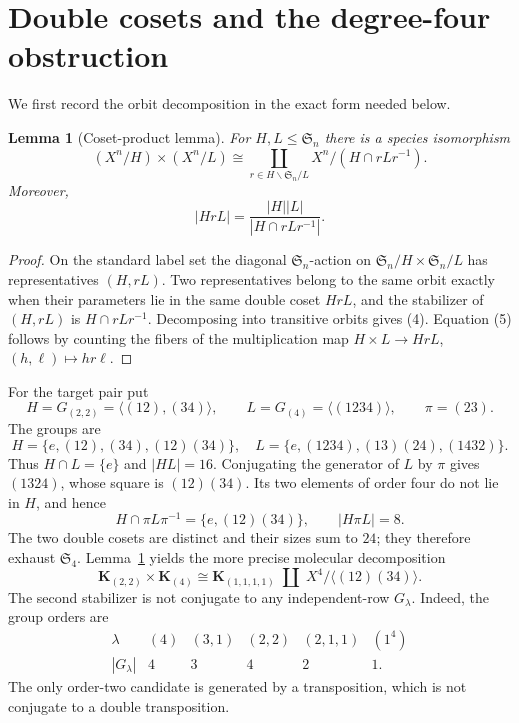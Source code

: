 \documentclass[11pt]{article}
\newtheorem{lemma}[theorem]{Lemma}
\begin{document}
\section{Double cosets and the degree-four obstruction}

We first record the orbit decomposition in the exact form needed below.

\begin{lemma}[Coset-product lemma]\label{lem:coset}
For $H,L\leq\mathfrak{S}_n$ there is a species isomorphism
\begin{equation}
 (X^n/H)\times(X^n/L)
 \cong
 \coprod_{r\in H\backslash\mathfrak{S}_n/L}
 X^n/(H\cap rLr^{-1}).
 \label{eq:coset-decomposition}
\end{equation}
Moreover,
\begin{equation}
 |HrL|=\frac{|H||L|}{|H\cap rLr^{-1}|}.
 \label{eq:double-coset-size}
\end{equation}
\end{lemma}

\begin{proof}
On the standard label set the diagonal $\mathfrak{S}_n$-action on
$\mathfrak{S}_n/H\times\mathfrak{S}_n/L$ has representatives $(H,rL)$.  Two representatives
belong to the same orbit exactly when their parameters lie in the same
double coset $HrL$, and the stabilizer of $(H,rL)$ is
$H\cap rLr^{-1}$.  Decomposing into transitive orbits gives (4).
Equation (5) follows by counting the fibers of the multiplication map
$H\times L\to HrL$, $(h,\ell)\mapsto hr\ell$.
\end{proof}

For the target pair put
\[
 H=G_{(2,2)}=\langle(12),(34)\rangle,
 \qquad L=G_{(4)}=\langle(1234)\rangle,
 \qquad \pi=(23).
\]
The groups are
\[
 H=\{e,(12),(34),(12)(34)\},
 \quad
 L=\{e,(1234),(13)(24),(1432)\}.
\]
Thus $H\cap L=\{e\}$ and $|HL|=16$.  Conjugating the generator of $L$ by
$\pi$ gives $(1324)$, whose square is $(12)(34)$.  Its two elements of
order four do not lie in $H$, and hence
\[
 H\cap\pi L\pi^{-1}=\{e,(12)(34)\},
 \qquad |H\pi L|=8.
\]
The two double cosets are distinct and their sizes sum to $24$; they
therefore exhaust $\mathfrak{S}_4$.  Lemma~\ref{lem:coset} yields the more precise
molecular decomposition
\begin{equation}
 \mathbf{K}_{(2,2)}\times\mathbf{K}_{(4)}
 \cong \mathbf{K}_{(1,1,1,1)}\;\coprod\;
 X^4/\langle(12)(34)\rangle.
 \label{eq:molecular-decomposition}
\end{equation}
The second stabilizer is not conjugate to any independent-row $G_\lambda$.
Indeed, the group orders are
\[
\begin{array}{c|ccccc}
\lambda&(4)&(3,1)&(2,2)&(2,1,1)&(1^4)\\ \hline
|G_\lambda|&4&3&4&2&1.
\end{array}
\]
The only order-two candidate is generated by a transposition, which is not
conjugate to a double transposition.
\end{document}

